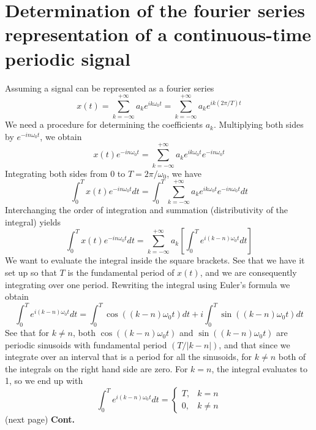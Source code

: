 \documentclass{report}
\begin{document}
\section{Determination of the fourier series\\representation of a continuous-time periodic signal}
Assuming a signal can be represented as a fourier series
\begin{equation*}
x(t)=\sum^{+\infty}_{k=-\infty}a_ke^{ik\omega_0t}=\sum^{+\infty}_{k=-\infty}a_ke^{ik(2\pi/T)t}
\end{equation*}
We need a procedure for determining the coefficients $a_k$. Multiplying both sides by $e^{-in\omega_0t}$, we obtain 
\begin{equation*}
x(t)e^{-in\omega_0t}=\sum^{+\infty}_{k=-\infty}a_ke^{ik\omega_0t}e^{-in\omega_0t}
\end{equation*}
Integrating both sides from 0 to $T=2\pi/\omega_0$, we have
\begin{equation*}
\int^T_0x(t)e^{-in\omega_0t}dt=\int^T_0\sum^{+\infty}_{k=-\infty}a_ke^{ik\omega_0t}e^{-in\omega_0t}dt
\end{equation*}
Interchanging the order of integration and summation (distributivity of the integral) yields
\begin{equation*}
\int^T_0x(t)e^{-in\omega_0t}dt=\sum^{+\infty}_{k=-\infty}a_k\left[\int^T_0e^{i(k-n)\omega_0t}dt\right]
\end{equation*}
We want to evaluate the integral inside the square brackets. See that we have it set up so that $T$ is the fundamental period of $x(t)$, and we are consequently integrating over one period. 
Rewriting the integral using Euler's formula we obtain
\begin{equation*}
\int^T_0e^{i(k-n)\omega_0t}dt=\int^T_0\cos((k-n)\omega_0t)dt+i\int^T_0\sin((k-n)\omega_0t)dt
\end{equation*}
See that for $k\neq n$, both $\cos((k-n)\omega_0t)$ and $\sin((k-n)\omega_0t)$ are periodic sinusoids with fundamental period $(T/|k-n|)$, 
and that since we integrate over an interval that is a period for all the sinusoids, for $k\neq n$ both of the integrals on the right hand side are zero. For $k=n$, the integral evaluates to 1, so we
end up with
\begin{equation*}
\int^T_0e^{i(k-n)\omega_0t}dt=\begin{cases}
T,&k=n\\
0,&k\neq n\end{cases}
\end{equation*}
(next page)\newpage
\noindent\textbf{Cont.}\\
\end{document}
